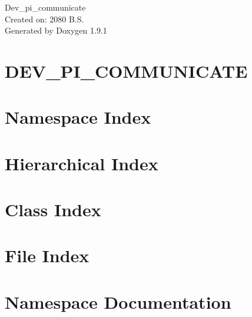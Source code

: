 \let\mypdfximage\pdfximage\def\pdfximage{\immediate\mypdfximage}\documentclass[twoside]{book}
\newcommand{\+}{\discretionary{\mbox{\scriptsize$\hookleftarrow$}}{}{}}
\newcommand{\clearemptydoublepage}{%
  \newpage{\pagestyle{empty}\cleardoublepage}%
}
\begin{document}
\raggedbottom

\hypersetup{pageanchor=false,
             bookmarksnumbered=true,
             pdfencoding=unicode
            }
\begin{titlepage}
\vspace*{7cm}
\begin{center}%
{\Large Dev\+\_\+pi\+\_\+communicate \\[1ex]\large Created on\+: 2080 B.\+S. }\\
\vspace*{1cm}
{\large Generated by Doxygen 1.9.1}\\
\end{center}
\end{titlepage}
\clearemptydoublepage
{}
\tableofcontents
\clearemptydoublepage
{}
\hypersetup{pageanchor=true}

\chapter{DEV\+\_\+\+PI\+\_\+\+COMMUNICATE}
\label{index}\hypertarget{index}{}
\chapter{Namespace Index}

\chapter{Hierarchical Index}

\chapter{Class Index}

\chapter{File Index}

\chapter{Namespace Documentation}

























\end{document}
